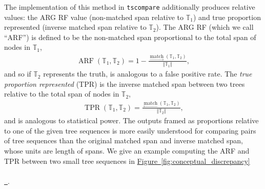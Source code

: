 \documentclass[10pt,twoside,lineno]{gsajnl}
\newcommand{\T}{\mathbb{T}}
\newcommand{\tscompare}{\texttt{tscompare}}
\newcommand{\match}{\underset{\longrightarrow}{\operatorname{match}}}
\newcommand{\invmatch}{\underset{\longleftarrow}{\operatorname{match}}}
\newcommand*{\figref}[2][]{%
	\hyperref[{#2}]{%
		Figure~\ref*{#2}%
		\ifx\\#1\\%
		\else
		\,#1%
		\fi
	}%
}
\begin{document}
The implementation of this method in \tscompare{}
additionally produces relative values:
the ARG RF value (non-matched span relative to $\T_1$)
and true proportion represented (inverse matched span relative to $\T_2$).
The ARG RF (which we call ``ARF'') is defined to be the non-matched span proportional
 to the total span of nodes in $\T_1$,
 \begin{align}\label{eqn:dissimilarity}
 	\operatorname{ARF}(\T_1,\T_2)
 	=1-\frac{\match(\T_1,\T_2)}{\Vert \T_1\Vert} ,
\end{align}
and so if $\T_2$ represents the truth, is analogous to a false positive rate.
The \emph{true proportion represented} (TPR) is the inverse matched span between 
two trees relative to the total span of nodes in $\T_2$,
\begin{align}\label{eqn:true-proportion}
	\operatorname{TPR}(\T_1,\T_2) = \frac{\invmatch(\T_1,\T_2)}
	{\Vert \T_2\Vert} ,
\end{align}
and is analogous to statistical power.
The outputs framed as proportions relative to one of the given tree sequences is more easily understood
for comparing pairs of tree sequences than the original matched span and inverse matched span, whose units are length of spans.
We give an example computing the ARF and TPR between two small tree sequences in \figref{fig:conceptual_discrepancy}. 
\end{document}
